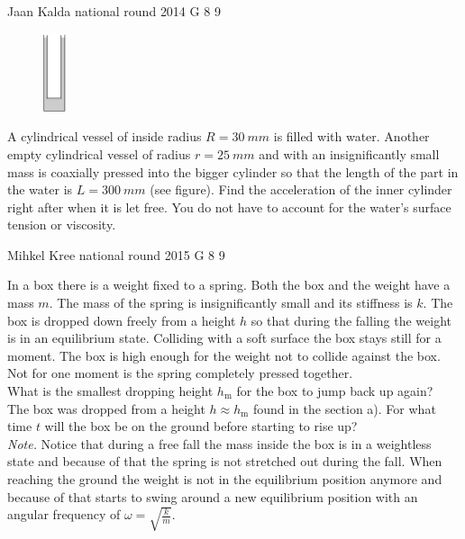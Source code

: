 \documentclass[11pt]{article}
\begin{document}
{Jaan Kalda} %
{national round} %
{2014} %
{G 8} %
{9} %
{

\ifEngStatement
\begin{figure}%
\vspace{-15pt}
\includegraphics[width=0.06\textwidth]{2014-v3g-08-cylinders}
\end{figure}
A cylindrical vessel of inside radius $R = \SI{30}{mm}$ is filled with water. Another empty cylindrical vessel of radius $r =\SI{25}{mm}$ and with an insignificantly small mass is coaxially pressed into the bigger cylinder so that the length of the part in the water is $L = \SI{300}{mm}$ (see figure). Find the acceleration of the inner cylinder right after when it is let free. You do not have to account for the water’s surface tension or viscosity.
\fi
}

{Mihkel Kree} %
{national round} %
{2015} %
{G 8} %
{9} %
{

\ifEngStatement
In a box there is a weight fixed to a spring. Both the box and the weight have a mass $m$. The mass of the spring is insignificantly small and its stiffness is $k$. The box is dropped down freely from a height $h$ so that during the falling the weight is in an equilibrium state. Colliding with a soft surface the box stays still for a moment. The box is high enough for the weight not to collide against the box. Not for one moment is the spring completely pressed together.\\
\osa What is the smallest dropping height $h_\text{m}$ for the box to jump back up again?\\
\osa The box was dropped from a height $h\approx h_\text{m}$ found in the section a). For what time $t$ will the box be on the ground before starting to rise up?\\
\emph{Note.} Notice that during a free fall the mass inside the box is in a weightless state and because of that the spring is not stretched out during the fall. When reaching the ground the weight is not in the equilibrium position anymore and because of that starts to swing around a new equilibrium position with an angular frequency of $\omega =\sqrt{\frac{k}{m}}$.
\fi
}
\end{document}
